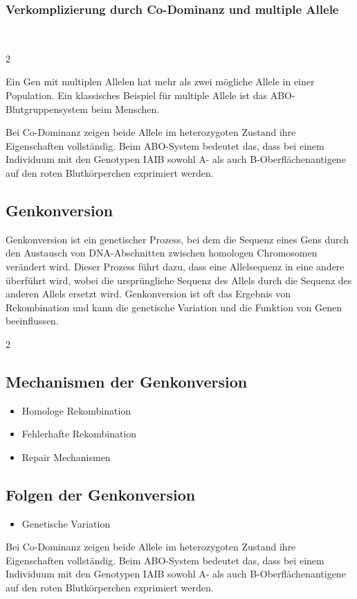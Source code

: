 \documentclass{article}
\begin{document}
\subsubsection*{Verkomplizierung durch Co-Dominanz und multiple Allele} 
$\ $
\begin{multicols}{2}
\begin{mybox}[title={Multiple Allele}]
Ein Gen mit multiplen Allelen hat mehr als zwei mögliche Allele in einer Population. Ein klassisches Beispiel für multiple Allele ist das ABO-Blutgruppensystem beim Menschen.
\end{mybox}
\columnbreak 
\begin{mybox}[title={Co-Dominanz}]
Bei Co-Dominanz zeigen beide Allele im heterozygoten Zustand ihre Eigenschaften vollständig. Beim ABO-System bedeutet das, dass bei einem Individuum mit den Genotypen IAIB sowohl A- als auch B-Oberflächenantigene auf den roten Blutkörperchen exprimiert werden.
\end{mybox}
\end{multicols}
\subsection*{Genkonversion}
Genkonversion ist ein genetischer Prozess, bei dem die Sequenz eines Gens durch den Austausch von DNA-Abschnitten zwischen homologen Chromosomen verändert wird. Dieser Prozess führt dazu, dass eine Allelsequenz in eine andere überführt wird, wobei die ursprüngliche Sequenz des Allels durch die Sequenz des anderen Allels ersetzt wird. Genkonversion ist oft das Ergebnis von Rekombination und kann die genetische Variation und die Funktion von Genen beeinflussen. 
\begin{multicols}{2}
\subsection*{Mechanismen der Genkonversion}
\begin{itemize}
    \item Homologe Rekombination
    \item Fehlerhafte Rekombination
    \item Repair Mechanismen
\end{itemize}
\subsection*{Folgen der Genkonversion}
\begin{itemize}
    \item Genetische Variation
\end{itemize}
\columnbreak
\begin{mybox}[title={Co-Dominanz}]
Bei Co-Dominanz zeigen beide Allele im heterozygoten Zustand ihre Eigenschaften vollständig. Beim ABO-System bedeutet das, dass bei einem Individuum mit den Genotypen IAIB sowohl A- als auch B-Oberflächenantigene auf den roten Blutkörperchen exprimiert werden.
\end{mybox}
\end{multicols}
\end{document}
